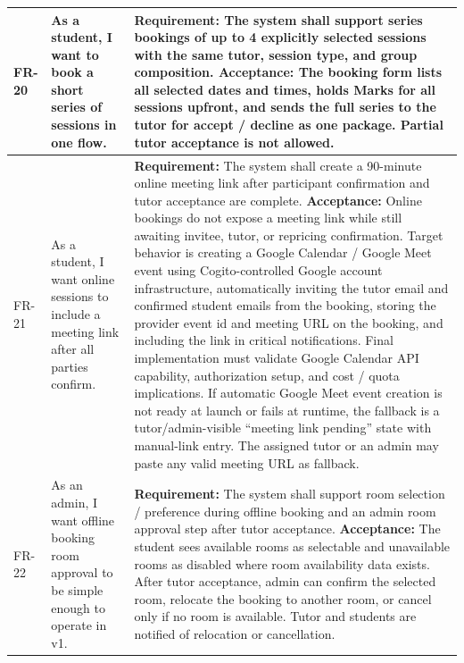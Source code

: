 \documentclass[11pt,a4paper]{article}
\begin{document}
\begin{longtable}{|L{1.5cm}|L{4.1cm}|L{9.0cm}|}
	\hline
	FR-20           & As a student, I want to book a short series of sessions in one flow.                         & \textbf{Requirement:} The system shall support series bookings of up to 4 explicitly selected sessions with the same tutor, session type, and group composition. \newline \textbf{Acceptance:} The booking form lists all selected dates and times, holds Marks for all sessions upfront, and sends the full series to the tutor for accept / decline as one package. Partial tutor acceptance is not allowed.                                                                                                                                                                                        \\
	\hline
	FR-21           & As a student, I want online sessions to include a meeting link after all parties confirm.                         & \textbf{Requirement:} The system shall create a 90-minute online meeting link after participant confirmation and tutor acceptance are complete. \newline \textbf{Acceptance:} Online bookings do not expose a meeting link while still awaiting invitee, tutor, or repricing confirmation. Target behavior is creating a Google Calendar / Google Meet event using Cogito-controlled Google account infrastructure, automatically inviting the tutor email and confirmed student emails from the booking, storing the provider event id and meeting URL on the booking, and including the link in critical notifications. Final implementation must validate Google Calendar API capability, authorization setup, and cost / quota implications. If automatic Google Meet event creation is not ready at launch or fails at runtime, the fallback is a tutor/admin-visible ``meeting link pending'' state with manual-link entry. The assigned tutor or an admin may paste any valid meeting URL as fallback.                                                                                                                                                                                        \\
	\hline
	FR-22           & As an admin, I want offline booking room approval to be simple enough to operate in v1.                         & \textbf{Requirement:} The system shall support room selection / preference during offline booking and an admin room approval step after tutor acceptance. \newline \textbf{Acceptance:} The student sees available rooms as selectable and unavailable rooms as disabled where room availability data exists. After tutor acceptance, admin can confirm the selected room, relocate the booking to another room, or cancel only if no room is available. Tutor and students are notified of relocation or cancellation.                                                                                                                                                                                        \\

\end{longtable}
\end{document}
